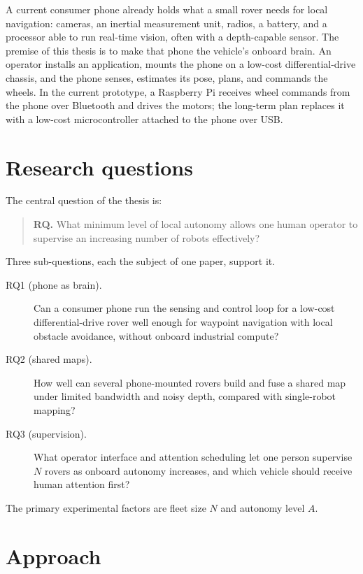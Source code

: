 A current consumer phone already holds what a small rover needs for local navigation: cameras, an inertial measurement unit, radios, a battery, and a processor able to run real-time vision, often with a depth-capable sensor.
The premise of this thesis is to make that phone the vehicle's onboard brain.
An operator installs an application, mounts the phone on a low-cost differential-drive chassis, and the phone senses, estimates its pose, plans, and commands the wheels.
In the current prototype, a Raspberry Pi receives wheel commands from the phone over Bluetooth and drives the motors; the long-term plan replaces it with a low-cost microcontroller attached to the phone over USB.

\section*{Research questions}

The central question of the thesis is:

\begin{quote}
\textbf{RQ.} What minimum level of local autonomy allows one human operator to supervise an increasing number of robots effectively?
\end{quote}

Three sub-questions, each the subject of one paper, support it.

\begin{description}
\item[RQ1 (phone as brain).] Can a consumer phone run the sensing and control loop for a low-cost differential-drive rover well enough for waypoint navigation with local obstacle avoidance, without onboard industrial compute?
\item[RQ2 (shared maps).] How well can several phone-mounted rovers build and fuse a shared map under limited bandwidth and noisy depth, compared with single-robot mapping?
\item[RQ3 (supervision).] What operator interface and attention scheduling let one person supervise \(N\) rovers as onboard autonomy increases, and which vehicle should receive human attention first?
\end{description}

The primary experimental factors are fleet size \(N\) and autonomy level \(A\).

\section*{Approach}

